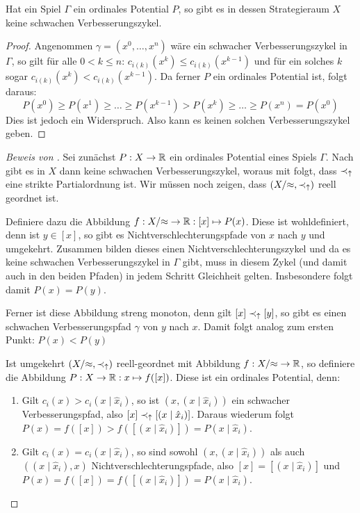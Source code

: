 \begin{prop}\label{prop:OrdPotKeineschwVBZ}
	Hat ein Spiel $\Gamma$ ein ordinales Potential $P$, so gibt es in dessen Strategieraum $X$ keine schwachen Verbesserungszykel.
\end{prop}

\begin{proof}
	Angenommen $\gamma = (x^0, \dots, x^n)$ wäre ein schwacher Verbesserungszykel in $\Gamma$, so gilt für alle $0 < k \leq n$: $c_{i(k)}(x^k) \leq c_{i(k)}(x^{k-1})$ und für ein solches $k$ sogar $c_{i(k)}(x^k) < c_{i(k)}(x^{k-1})$. Da ferner $P$ ein ordinales Potential ist, folgt daraus:
		\[P(x^0) \geq P(x^1) \geq \dots \geq P(x^{k-1}) > P(x^k) \geq \dots \geq P(x^n) = P(x^0)\]
	Dies ist jedoch ein Widerspruch. Also kann es keinen solchen Verbesserungszykel geben.
\end{proof}

\begin{proof}[Beweis von ]
	Sei zunächst $P: X \to \mathbb{R}$ ein ordinales Potential eines Spiels $\Gamma$. Nach  gibt es in $X$ dann keine schwachen Verbesserungszykel, woraus mit  folgt, dass $\prec_\uparrow$ eine strikte Partialordnung ist. Wir müssen noch zeigen, dass $(X/{\approx}, \prec_\uparrow)$ reell geordnet ist. 
	
	Definiere dazu die Abbildung $f: X/{\approx} \to \mathbb{R}: [x] \mapsto P(x)$. Diese ist wohldefiniert, denn ist $y \in [x]$, so gibt es Nichtverschlechterungspfade von $x$ nach $y$ und umgekehrt. Zusammen bilden dieses einen Nichtverschlechterungszykel und da es keine schwachen Verbesserungszykel in $\Gamma$ gibt, muss in diesem Zykel (und damit auch in den beiden Pfaden) in jedem Schritt Gleichheit gelten. Insbesondere folgt damit $P(x) = P(y)$.
		
	Ferner ist diese Abbildung streng monoton, denn gilt $[x] \prec_\uparrow [y]$, so gibt es einen schwachen Verbesserungspfad $\gamma$ von $y$ nach $x$. Damit folgt analog zum ersten Punkt: $P(x) < P(y)$
	
	Ist umgekehrt $(X/{\approx}, \prec_\uparrow)$ reell-geordnet mit Abbildung $f: X/{\approx} \to \mathbb{R}$, so definiere die Abbildung $P: X \to \mathbb{R}: x \mapsto f([x])$. Diese ist ein ordinales Potential, denn:
	\begin{enumerate}
		\item Gilt $c_i(x) > c_i(x \mid \hat{x}_i)$, so ist $(x, (x \mid \hat{x}_i))$ ein schwacher Verbesserungspfad, also $[x] \prec_\uparrow [(x \mid \hat{x}_i)]$. Daraus wiederum folgt $P(x) = f([x]) > f([(x \mid \hat{x}_i)]) = P(x \mid \hat{x}_i)$.
		\item Gilt $c_i(x) = c_i(x \mid \hat{x}_i)$, so sind sowohl $(x, (x \mid \hat{x}_i))$ als auch $((x \mid \hat{x}_i), x)$ Nichtverschlechterungspfade, also $[x] = [(x \mid \hat{x}_i)]$ und $P(x) = f([x]) = f([(x \mid \hat{x}_i)]) = P(x \mid \hat{x}_i)$. \qedhere 
	\end{enumerate}
\end{proof}

